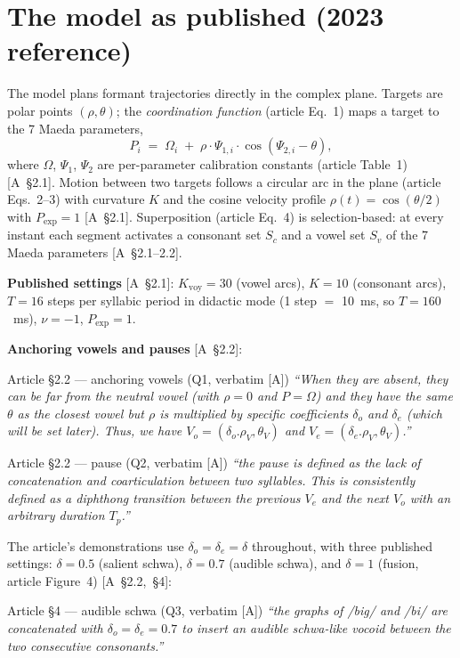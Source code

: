 \documentclass[11pt,letterpaper]{article}
\begin{document}
\section{The model as published (2023 reference)}

The model plans formant trajectories directly in the complex plane. Targets
are polar points $(\rho,\theta)$; the \emph{coordination function} (article
Eq.~1) maps a target to the 7 Maeda parameters,
\begin{equation}
P_i \;=\; \Omega_i \;+\; \rho \cdot \Psi_{1,i} \cdot
\cos\!\left(\Psi_{2,i} - \theta\right),
\label{eq:coordination}
\end{equation}
where $\Omega$, $\Psi_1$, $\Psi_2$ are per-parameter calibration constants
(article Table~1) \hbox{[A \S2.1]}. Motion between two targets follows a
circular arc in the plane (article Eqs.~2--3) with curvature $K$ and the
cosine velocity profile $\rho(t)=\cos(\theta/2)$ with $P_{\text{exp}}=1$
\hbox{[A \S2.1]}. Superposition (article Eq.~4) is selection-based: at every
instant each segment activates a consonant set $S_c$ and a vowel set $S_v$ of
the 7 Maeda parameters \hbox{[A \S2.1--2.2]}.

\textbf{Published settings} \hbox{[A \S2.1]}: $K_{\text{voy}} = 30$ (vowel
arcs), $K = 10$ (consonant arcs), $T = 16$ steps per syllabic period in
didactic mode (1 step $=$ 10~ms, so $T = 160$~ms), $\nu = -1$,
$P_{\text{exp}} = 1$.

\textbf{Anchoring vowels and pauses} \hbox{[A \S2.2]}:
\begin{qbox}{Article \S2.2 --- anchoring vowels (Q1, verbatim [A])}
\small\itshape
``When they are absent, they can be far from the neutral vowel (with $\rho=0$
and $P=\Omega$) and they have the same $\theta$ as the closest vowel but
$\rho$ is multiplied by specific coefficients $\delta_o$ and $\delta_e$
(which will be set later). Thus, we have $V_o=(\delta_o.\rho_V,\theta_V)$ and
$V_e=(\delta_e.\rho_V,\theta_V)$.''
\end{qbox}
\begin{qbox}{Article \S2.2 --- pause (Q2, verbatim [A])}
\small\itshape
``the pause is defined as the lack of concatenation and coarticulation between
two syllables. This is consistently defined as a diphthong transition between
the previous $V_e$ and the next $V_o$ with an arbitrary duration $T_p$.''
\end{qbox}
\noindent The article's demonstrations use $\delta_o=\delta_e=\delta$
throughout, with three published settings: $\delta=0.5$ (salient schwa),
$\delta=0.7$ (audible schwa), and $\delta=1$ (fusion, article Figure~4)
\hbox{[A \S2.2, \S4]}:
\begin{qbox}{Article \S4 --- audible schwa (Q3, verbatim [A])}
\small\itshape
``the graphs of /big/ and /bi/ are concatenated with $\delta_o=\delta_e=0.7$
to insert an audible schwa-like vocoid between the two consecutive
consonants.''
\end{qbox}
\end{document}
